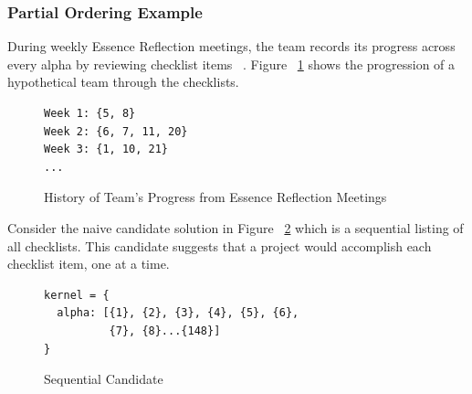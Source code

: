 \documentclass[preprint,12pt,3p]{elsarticle}
\begin{document}


\subsubsection{Partial Ordering Example}

During weekly Essence Reflection meetings, the team records its progress across every alpha by reviewing checklist items ~\cite{ICSE2014}. Figure ~\ref{history} shows the progression of a hypothetical team through the checklists.

\begin{figure}[!htb]
\begin{verbatim}
Week 1: {5, 8}
Week 2: {6, 7, 11, 20} 
Week 3: {1, 10, 21} 
...
\end{verbatim}
 \caption{History of Team's Progress from Essence Reflection Meetings}
 \label{history}
\end{figure}

Consider the naive candidate solution in Figure ~\ref{sequential_candidate} which is a sequential listing of all checklists. This candidate suggests that a project would accomplish each checklist item, one at a time.

\begin{figure}[!htb]
\begin{verbatim}
kernel = {
  alpha: [{1}, {2}, {3}, {4}, {5}, {6}, 
          {7}, {8}...{148}]
}
\end{verbatim}
 \caption{Sequential Candidate}
 \label{sequential_candidate}
\end{figure}
\end{document}

